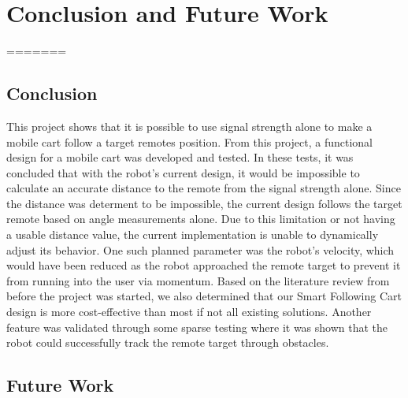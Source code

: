 \chapter{Conclusion and Future Work}
\label{ch: Chapter6}
=======
\label{ch: conclusionAndFuture}

\section{Conclusion}

This project shows that it is possible to use signal strength alone to make a mobile cart follow a target remotes position.  From this project, a functional design for a mobile cart was developed and tested.  In these tests, it was concluded that with the robot's current design, it would be impossible to calculate an accurate distance to the remote from the signal strength alone.  Since the distance was determent to be impossible, the current design follows the target remote based on angle measurements alone.  Due to this limitation or not having a usable distance value, the current implementation is unable to dynamically adjust its behavior. One such planned parameter was the robot's velocity, which would have been reduced as the robot approached the remote target to prevent it from running into the user via momentum.  Based on the literature review from before the project was started, we also determined that our Smart Following Cart design is more cost-effective than most if not all existing solutions.  Another feature was validated through some sparse testing where it was shown that the robot could successfully track the remote target through obstacles.

\section{Future Work}

